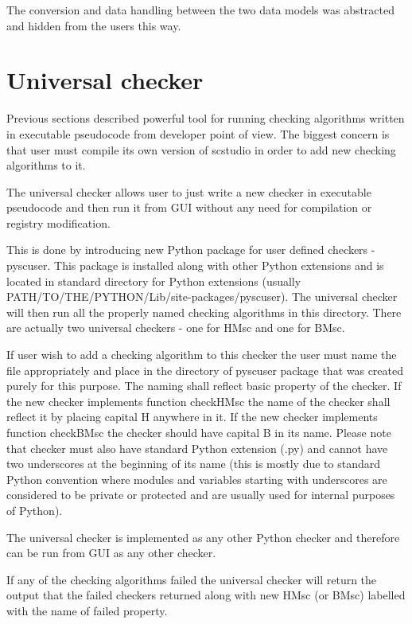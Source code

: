 \documentclass[11pt,oneside]{fithesis2}
\begin{document}
The conversion and data handling between the two data models was abstracted and hidden from the users this way.

\section{Universal checker}
Previous sections described powerful tool for running checking algorithms written in executable pseudocode from developer point of view. The biggest concern is that user must compile its own version of scstudio in order to add new checking algorithms to it.

The universal checker allows user to just write a new checker in executable pseudocode and then run it from GUI without any need for compilation or registry modification.

This is done by introducing new Python package for user defined checkers - pyscuser. This package is installed along with other Python extensions and is located in standard directory for Python extensions (usually PATH/TO/THE/PYTHON/Lib/site-packages/pyscuser). The universal checker will then run all the properly named checking algorithms in this directory. There are actually two universal checkers - one for HMsc and one for BMsc.

If user wish to add a checking algorithm to this checker the user must name the file appropriately and place in the directory of pyscuser package that was created purely for this purpose. The naming shall reflect basic property of the checker. If the new checker implements function checkHMsc the name of the checker shall reflect it by placing capital H anywhere in it. If the new checker implements function checkBMsc the checker should have capital B in its name. Please note that checker must also have standard Python extension (.py) and cannot have two underscores at the beginning of its name (this is mostly due to standard Python convention where modules and variables starting with underscores are considered to be private or protected and are usually used for internal purposes of Python).

The universal checker is implemented as any other Python checker and therefore can be run from GUI as any other checker.

If any of the checking algorithms failed the universal checker will return the output that the failed checkers returned along with new HMsc (or BMsc) labelled with the name of failed property.
\end{document}
